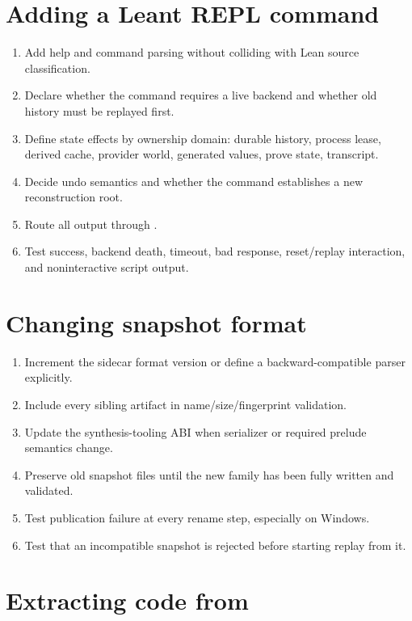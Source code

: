 \documentclass[10pt,letterpaper,oneside]{report}
\newcommand{\code}[1]{\texttt{\detokenize{#1}}}
\begin{document}
\section{Adding a Leant REPL command}

\begin{enumerate}
  \item Add help and command parsing without colliding with Lean source classification.
  \item Declare whether the command requires a live backend and whether old history must be replayed first.
  \item Define state effects by ownership domain: durable history, process lease, derived cache, provider world, generated values, prove state, transcript.
  \item Decide undo semantics and whether the command establishes a new reconstruction root.
  \item Route all output through \code{emit}.
  \item Test success, backend death, timeout, bad response, reset/replay interaction, and noninteractive script output.
\end{enumerate}

\section{Changing snapshot format}

\begin{enumerate}
  \item Increment the sidecar format version or define a backward-compatible parser explicitly.
  \item Include every sibling artifact in name/size/fingerprint validation.
  \item Update the synthesis-tooling ABI when serializer or required prelude semantics change.
  \item Preserve old snapshot files until the new family has been fully written and validated.
  \item Test publication failure at every rename step, especially on Windows.
  \item Test that an incompatible snapshot is rejected before starting replay from it.
\end{enumerate}

\section{Extracting code from \code{Main.hs}}
\end{document}
